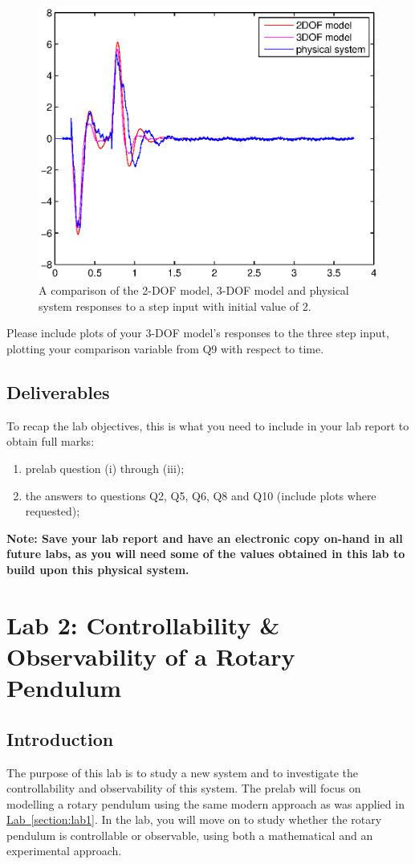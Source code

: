 \documentclass[12pt]{report}
\begin{document}
\begin{enumerate}[Question]
          \begin{figure}[htb!]
              \centering
              \includegraphics[width=.45\linewidth]{eps/lab_1/step_2to0_comparison.eps} \quad \quad
              \caption{A comparison of the 2-DOF model, 3-DOF model and physical system responses to a step input with initial value of 2.}
              \label{fig:lab1_comparison_step2to0}
          \end{figure}
\end{enumerate}

Please include plots of your 3-DOF model's responses to the three step input, plotting your comparison variable from Q9 with respect to time.
\newpage
\subsection{Deliverables}
To recap the lab objectives, this is what you need to include in your lab report to obtain full marks:
\begin{enumerate}
    \item prelab question (i) through (iii);
    \item the answers to questions Q2, Q5, Q6, Q8 and Q10 (include plots where requested);
\end{enumerate}
\textbf{Note: Save your lab report and have an electronic copy on-hand in all future labs, as you will need some of the values obtained in this lab to build upon this physical system.}

\newpage
\section{Lab 2: Controllability \& Observability of a Rotary Pendulum} \label{section:lab2}

\subsection{Introduction}\label{subsection:lab2_intro}
The purpose of this lab is to study a new system and to investigate the controllability and observability of this system. The prelab will focus on modelling a rotary pendulum using the same modern approach as was applied in \hyperref[section:lab1]{Lab~\ref{section:lab1}}. In the lab, you will move on to study whether the rotary pendulum is controllable or observable, using both a mathematical and an experimental approach.
\end{document}
